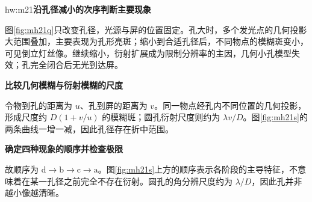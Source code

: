 \begin{drillsolution}{hw:m21}\textbf{沿孔径减小的次序判断主要现象}\par\nobreak
图\ref{fig:mh21q}只改变孔径，光源与屏的位置固定。孔大时，多个发光点的几何投影大范围叠加，主要表现为孔形亮斑；缩小到合适孔径后，不同物点的模糊斑变小，可见倒立灯丝像。继续缩小，衍射扩展成为限制分辨率的主因，几何小孔模型失效；孔完全闭合后无光到达屏。



\par\medskip{}\noindent\textbf{比较几何模糊与衍射模糊的尺度}\par\nobreak
令物到孔的距离为 $u$、孔到屏的距离为 $v$。同一物点经孔内不同位置的几何投影，形成尺度约 $D(1+v/u)$ 的模糊斑；圆孔衍射尺度则约为 $\lambda v/D$。图\ref{fig:mh21s}的两条曲线一增一减，因此孔径存在折中范围。

\par\medskip{}\noindent\textbf{确定四种现象的顺序并检查极限}\par\nobreak
故顺序为 \(\boxed{\mathrm{d\to b\to c\to a}}\)。图\ref{fig:mh21s}上方的顺序表示各阶段的主导特征，不意味着在某一孔径之前完全不存在衍射。圆孔的角分辨尺度约为 \(\lambda/D\)，因此孔并非越小像越清晰。

\end{drillsolution}

